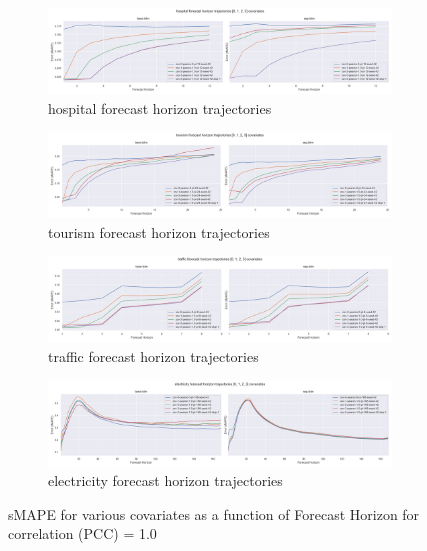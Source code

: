 \documentclass{article}
\begin{document}
\begin{figure}[tbp]
\begin{subfigure}{\textwidth}
\centering
\includegraphics[width=\linewidth]{figures/models_hosp_k.png}
\caption{hospital forecast horizon trajectories}
\label{fig:base-lstm_seg-lstm_hospital_k_0_1_2_3_trajectory}
\end{subfigure}

\begin{subfigure}{\textwidth}
\centering
\includegraphics[width=\linewidth]{figures/models_tour_k.png}
\caption{tourism forecast horizon trajectories}
\label{fig:base-lstm_seg-lstm_tourism_k_0_1_2_3_trajectory}
\end{subfigure}

\begin{subfigure}{\textwidth}
\centering
\includegraphics[width=\linewidth]{figures/models_traf_k.png}
\caption{traffic forecast horizon trajectories}
\label{fig:base-lstm_seg-lstm_traffic_k_0_1_2_3_trajectory}
\end{subfigure}

\begin{subfigure}{\textwidth}
\centering
\includegraphics[width=\linewidth]{figures/models_elec_k.png}
\caption{electricity forecast horizon trajectories}
\label{fig:base-lstm_seg-lstm_electricity_k_0_1_2_3_trajectory}
\end{subfigure}

\caption{sMAPE for various covariates as a function of Forecast Horizon for correlation (PCC) = 1.0}
\label{fig:base-lstm_seg-lstm_k_0_1_2_3_trajectory}
\end{figure}
\end{document}

